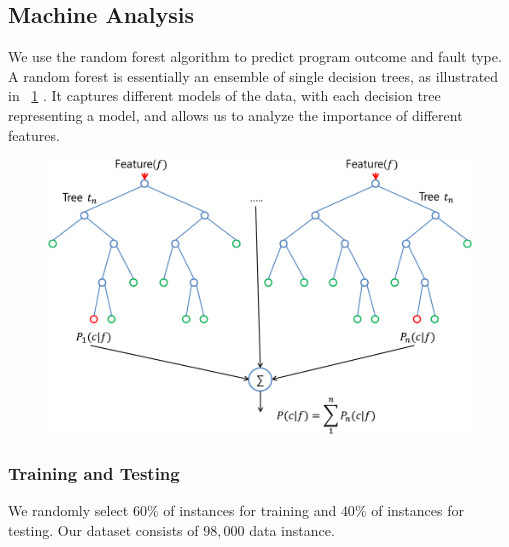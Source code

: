 
\subsection{Machine Analysis}
We use the random forest algorithm to predict program outcome and fault type. A random forest is essentially an ensemble of single decision trees, as illustrated in ~\ref{fig:rf} \cite{breiman2001random}. It captures different models of the data, with each decision tree representing a model, and allows us to analyze the importance of different features. 

\begin{figure}[t]
\begin{center}
   \includegraphics[width=0.95\linewidth]{./figures/rf.png}
\end{center}
   \caption{}
\label{fig:rf}
\end{figure}

\subsubsection{Training and Testing}
We randomly select $60\%$ of instances for training and $40\%$ of instances for testing. Our dataset consists of $98,000$ data instance.